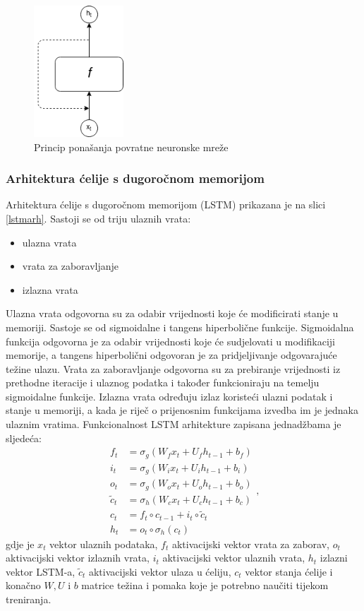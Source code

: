 \documentclass[times, utf8, zavrsni]{fer}
\begin{document}
\begin{figure}
	\centering
	\includegraphics[width=0.3\textwidth]{rnn}
	\caption{Princip ponašanja povratne neuronske mreže}
	\label{rnnprincip}
\end{figure}

\subsubsection{Arhitektura ćelije s dugoročnom memorijom}
Arhitektura ćelije s dugoročnom memorijom (\gls{LSTM}) prikazana je na slici \ref{lstmarh}. Sastoji se od triju ulaznih vrata:
\begin{itemize}
	\item ulazna vrata
	\item vrata za zaboravljanje
	\item izlazna vrata
\end{itemize}

Ulazna vrata odgovorna su za odabir vrijednosti koje će modificirati stanje u memoriji. Sastoje se od sigmoidalne i tangens hiperbolične funkcije. Sigmoidalna funkcija odgovorna je za odabir vrijednosti koje će sudjelovati u modifikaciji memorije, a tangens hiperbolični odgovoran je za pridjeljivanje odgovarajuće težine ulazu. Vrata za zaboravljanje odgovorna su za prebiranje vrijednosti iz prethodne iteracije i ulaznog podatka i također funkcioniraju na temelju sigmoidalne funkcije. Izlazna vrata određuju izlaz koristeći ulazni podatak i stanje u memoriji, a kada je riječ o prijenosnim funkcijama izvedba im je jednaka ulaznim vratima. Funkcionalnost \gls{LSTM} arhitekture zapisana jednadžbama je sljedeća: \[ \begin{aligned}
f_{t} &=\sigma_{g}\left(W_{f} x_{t}+U_{f} h_{t-1}+b_{f}\right) \\
i_{t} &=\sigma_{g}\left(W_{i} x_{t}+U_{i} h_{t-1}+b_{i}\right) \\
o_{t} &=\sigma_{g}\left(W_{o} x_{t}+U_{o} h_{t-1}+b_{o}\right) \\
\tilde{c}_{t} &=\sigma_{h}\left(W_{c} x_{t}+U_{c} h_{t-1}+b_{c}\right) \\
c_{t} &=f_{t} \circ c_{t-1}+i_{t} \circ \tilde{c}_{t} \\
h_{t} &=o_{t} \circ \sigma_{h}\left(c_{t}\right)
\end{aligned}, \]
gdje je $x_t$ vektor ulaznih podataka, $f_t$ aktivacijski vektor vrata za zaborav, $o_t$ aktivacijski vektor izlaznih vrata, $i_t$ aktivacijski vektor ulaznih vrata, $h_t$ izlazni vektor \gls{LSTM}-a, $\tilde{c}_t$ aktivacijski vektor ulaza u ćeliju, $c_t$ vektor stanja ćelije i konačno $W, U$ i $b$ matrice težina i pomaka koje je potrebno naučiti tijekom treniranja.
\end{document}
